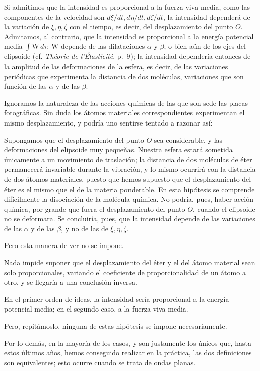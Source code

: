 Si admitimos que la intensidad es proporcional a la fuerza viva media,
como las componentes de la velocidad son $d\xi/dt,d\eta/dt,d\zeta/dt$, la
intensidad dependerá de la variación de $\xi,\eta,\zeta$ con el tiempo, es
decir, del desplazamiento del punto $O$. Admitamos, al contrario, que la
intensidad es proporcional a la energía potencial media $\int \mathrm{W}\,d\tau$;
$\mathrm{W}$ depende de las dilataciones $\alpha$ y $\beta$; o bien aún de
los ejes del elipsoide (cf. \emph{Théorie de l'Élasticité}, p.~9); la
intensidad dependería entonces de la amplitud de las deformaciones de la
esfera, es decir, de las variaciones periódicas que experimenta la
distancia de dos moléculas, variaciones que son función de las $\alpha$ y
de las $\beta$.

Ignoramos la naturaleza de las acciones químicas de las que son sede las
placas fotográficas. Sin duda los átomos materiales correspondientes
experimentan el mismo desplazamiento, y podría uno sentirse tentado a
razonar así:

Supongamos que el desplazamiento del punto $O$ sea considerable, y las
deformaciones del elipsoide muy pequeñas. Nuestra esfera estará sometida
únicamente a un movimiento de traslación; la distancia de dos moléculas de
éter permanecerá invariable durante la vibración, y lo mismo ocurrirá con
la distancia de dos átomos materiales, puesto que hemos supuesto que el
desplazamiento del éter es el mismo que el de la materia ponderable. En
esta hipótesis se comprende difícilmente la disociación de la molécula
química. No podría, pues, haber acción química, por grande que fuera el
desplazamiento del punto $O$, cuando el elipsoide no se deformara. Se
concluiría, pues, que la intensidad depende de las variaciones de las
$\alpha$ y de las $\beta$, y no de las de $\xi,\eta,\zeta$.

Pero esta manera de ver no se impone.

Nada impide suponer que el desplazamiento del éter y el del átomo material
sean solo proporcionales, variando el coeficiente de proporcionalidad de un
átomo a otro, y se llegaría a una conclusión inversa.

En el primer orden de ideas, la intensidad sería proporcional a la energía
potencial media; en el segundo caso, a la fuerza viva media.

Pero, repitámoslo, ninguna de estas hipótesis se impone necesariamente.

Por lo demás, en la mayoría de los casos, y son justamente los únicos que,
hasta estos últimos años, hemos conseguido realizar en la práctica, las dos
definiciones son equivalentes; esto ocurre cuando se trata de ondas
planas.

